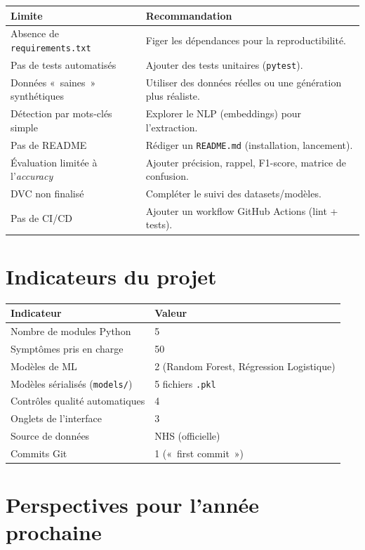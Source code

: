 \documentclass[11pt,a4paper]{article}
\begin{document}
\begin{longtable}{@{}p{7cm} p{8cm}@{}}
\toprule
\textbf{Limite} & \textbf{Recommandation} \\
\midrule
\endhead
Absence de \texttt{requirements.txt} & Figer les dépendances pour la reproductibilité. \\
Pas de tests automatisés & Ajouter des tests unitaires (\texttt{pytest}). \\
Données «~saines~» synthétiques & Utiliser des données réelles ou une génération plus réaliste. \\
Détection par mots-clés simple & Explorer le NLP (embeddings) pour l'extraction. \\
Pas de README & Rédiger un \texttt{README.md} (installation, lancement). \\
Évaluation limitée à l'\textit{accuracy} & Ajouter précision, rappel, F1-score, matrice de confusion. \\
DVC non finalisé & Compléter le suivi des datasets/modèles. \\
Pas de CI/CD & Ajouter un workflow GitHub Actions (lint + tests). \\
\bottomrule
\end{longtable}

\section{Indicateurs du projet}

\begin{longtable}{@{}p{9cm} p{5cm}@{}}
\toprule
\textbf{Indicateur} & \textbf{Valeur} \\
\midrule
\endhead
Nombre de modules Python & 5 \\
Symptômes pris en charge & 50 \\
Modèles de ML & 2 (Random Forest, Régression Logistique) \\
Modèles sérialisés (\texttt{models/}) & 5 fichiers \texttt{.pkl} \\
Contrôles qualité automatiques & 4 \\
Onglets de l'interface & 3 \\
Source de données & NHS (officielle) \\
Commits Git & 1 («~first commit~») \\
\bottomrule
\end{longtable}

\section{Perspectives pour l'année prochaine}
\end{document}
